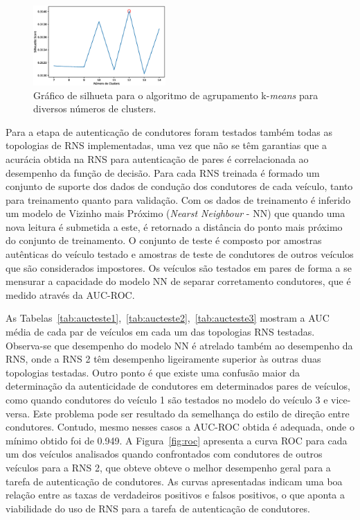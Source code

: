 \documentclass[conference,harvard,brazil,english]{sbatex}
\begin{document}
\begin{figure}[!ht]
\centering
\includegraphics[width=0.45\textwidth]{kmeans.eps}
\caption{Gráfico de silhueta para o algoritmo de agrupamento k-\textit{means} para diversos números de clusters.}
\label{fig:kmeans}
\end{figure}

Para a etapa de autenticação de condutores foram testados também todas as topologias de RNS implementadas, uma vez que não se têm garantias que a acurácia obtida na RNS para autenticação de pares é correlacionada ao desempenho da função de decisão. Para cada RNS treinada é formado um conjunto de suporte dos dados de condução dos condutores de cada veículo, tanto para treinamento quanto para validação. Com os dados de treinamento é inferido um modelo de Vizinho mais Próximo (\textit{Nearst Neighbour} - NN) que quando uma nova leitura é submetida a este, é retornado a distância do ponto mais próximo do conjunto de treinamento. O conjunto de teste é composto por amostras autênticas do veículo testado e amostras de teste de condutores de outros veículos que são considerados impostores. Os veículos são testados em pares de forma a se mensurar a capacidade do modelo NN de separar corretamento condutores, que é medido através da AUC-ROC. 

As Tabelas~\ref{tab:aucteste1},~\ref{tab:aucteste2},~\ref{tab:aucteste3} mostram a AUC média de cada par de veículos em cada um das topologias RNS testadas. Observa-se que desempenho do modelo NN é atrelado também ao desempenho da RNS, onde a RNS 2 têm desempenho ligeiramente superior às outras duas topologias testadas. Outro ponto é que existe uma confusão maior da determinação da autenticidade de condutores em determinados pares de veículos, como quando condutores do veículo 1 são testados no modelo do veículo 3 e vice-versa. Este problema pode ser resultado da semelhança do estilo de direção entre condutores. Contudo, mesmo nesses casos a AUC-ROC obtida é adequada, onde o mínimo obtido foi de 0.949. A Figura~\ref{fig:roc} apresenta a curva ROC para cada um dos veículos analisados quando confrontados com condutores de outros veículos para a RNS 2, que obteve obteve o melhor desempenho geral para a tarefa de autenticação de condutores. As curvas apresentadas indicam uma boa relação entre as taxas de verdadeiros positivos e falsos positivos, o que aponta a viabilidade do uso de RNS para a tarefa de autenticação de condutores.
\end{document}
